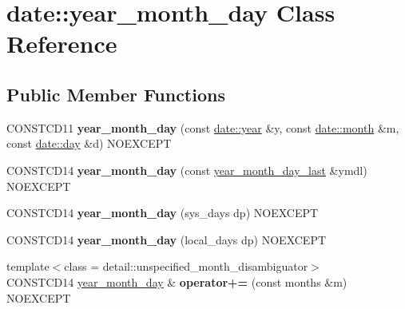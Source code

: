 \hypertarget{classdate_1_1year__month__day}{}\section{date\+::year\+\_\+month\+\_\+day Class Reference}
\label{classdate_1_1year__month__day}
\subsection*{Public Member Functions}
\begin{DoxyCompactItemize}
\item 
\mbox{\label{classdate_1_1year__month__day_a0c88822f75cb37f594ebaa3594ff23ea}} 
C\+O\+N\+S\+T\+C\+D11 {\bfseries year\+\_\+month\+\_\+day} (const \mbox{\hyperlink{classdate_1_1year}{date\+::year}} \&y, const \mbox{\hyperlink{classdate_1_1month}{date\+::month}} \&m, const \mbox{\hyperlink{classdate_1_1day}{date\+::day}} \&d) N\+O\+E\+X\+C\+E\+PT
\item 
\mbox{\label{classdate_1_1year__month__day_ad5377f13aa834eec9a3f5663dc7d604d}} 
C\+O\+N\+S\+T\+C\+D14 {\bfseries year\+\_\+month\+\_\+day} (const \mbox{\hyperlink{classdate_1_1year__month__day__last}{year\+\_\+month\+\_\+day\+\_\+last}} \&ymdl) N\+O\+E\+X\+C\+E\+PT
\item 
\mbox{\label{classdate_1_1year__month__day_a3a2e417d191b002f13141b00ca3b6767}} 
C\+O\+N\+S\+T\+C\+D14 {\bfseries year\+\_\+month\+\_\+day} (sys\+\_\+days dp) N\+O\+E\+X\+C\+E\+PT
\item 
\mbox{\label{classdate_1_1year__month__day_a5a749b0767e8b47a4848b36df1d2d893}} 
C\+O\+N\+S\+T\+C\+D14 {\bfseries year\+\_\+month\+\_\+day} (local\+\_\+days dp) N\+O\+E\+X\+C\+E\+PT
\item 
\mbox{\label{classdate_1_1year__month__day_ac5224c3eb0f2fc0a56172eba6bd935db}} 
{\footnotesize template$<$class  = detail\+::unspecified\+\_\+month\+\_\+disambiguator$>$ }\\C\+O\+N\+S\+T\+C\+D14 \mbox{\hyperlink{classdate_1_1year__month__day}{year\+\_\+month\+\_\+day}} \& {\bfseries operator+=} (const months \&m) N\+O\+E\+X\+C\+E\+PT
\item 

\end{DoxyCompactItemize}
